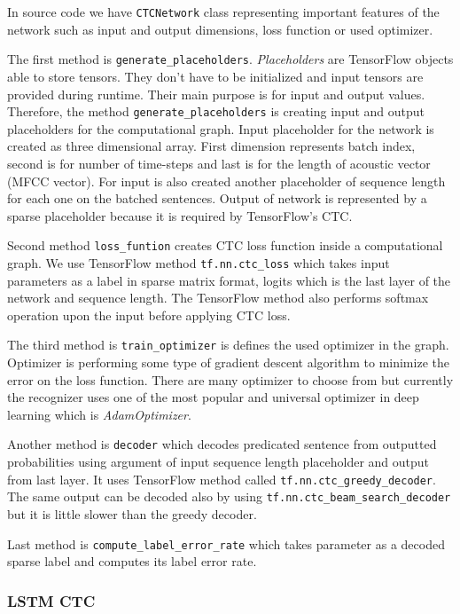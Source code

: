 In source code we have \texttt{CTCNetwork} class representing important features of the network such as input and output dimensions, loss function or used optimizer.

The first method is \texttt{generate\_placeholders}. \textit{Placeholders} are TensorFlow objects able to store tensors. They don't have to be initialized and input tensors are provided during runtime.
Their main purpose is for input and output values.
Therefore, the method \texttt{generate\_placeholders} is creating input and output placeholders for the computational graph.
Input placeholder for the network is created as three dimensional array. First dimension represents batch index, second is for number of time-steps and last is for the length of acoustic vector (MFCC vector).
For input is also created another placeholder of sequence length for each one on the batched sentences.
Output of network is represented by a sparse placeholder because it is required by TensorFlow's CTC.

Second method \texttt{loss\_funtion} creates CTC loss function inside a computational graph.
We use TensorFlow method \texttt{tf.nn.ctc\_loss} which takes input parameters as a label in sparse matrix format, logits which is the last layer of the network and sequence length.
The TensorFlow method also performs softmax operation upon the input before applying CTC loss.

The third method is \texttt{train\_optimizer} is defines the used optimizer in the graph. Optimizer is performing some type of gradient descent algorithm to minimize the error on the loss function.
There are many optimizer to choose from but currently the recognizer uses one of the most popular and universal optimizer in deep learning which is \textit{AdamOptimizer}.

Another method is \texttt{decoder} which decodes predicated sentence from outputted probabilities using argument of input sequence length placeholder and output from last layer.
It uses TensorFlow method called \texttt{tf.nn.ctc\_greedy\_decoder}. The same output can be decoded also by using \texttt{tf.nn.ctc\_beam\_search\_decoder} but it is little slower than the greedy decoder.

Last method is \texttt{compute\_label\_error\_rate} which takes parameter as a decoded sparse label and computes its label error rate.

\subsubsection{LSTM CTC}


